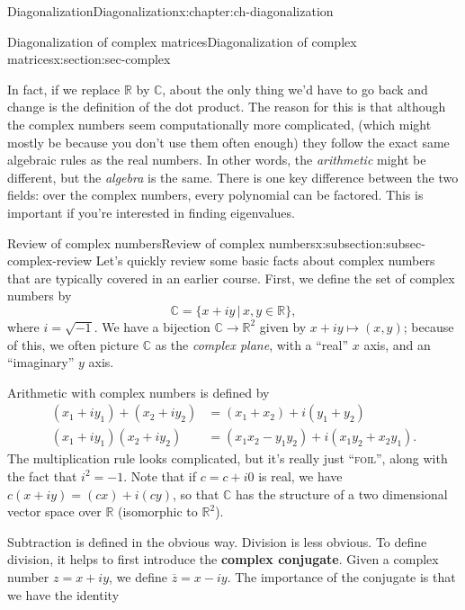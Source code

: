 \documentclass[oneside,10pt,]{book}
\newcommand{\initialism}[1]{\textsc{\MakeLowercase{#1}}}
\newcommand{\terminology}[1]{\textbf{#1}}
\numberwithin{equation}{section}
\newcommand{\R}{\mathbb{R}}
\renewcommand{\C}{\mathbb{C}}
\newcommand{\amp}{&}
\begin{document}
\begin{chapterptx}{Diagonalization}{}{Diagonalization}{}{}{x:chapter:ch-diagonalization}
\begin{sectionptx}{Diagonalization of complex matrices}{}{Diagonalization of complex matrices}{}{}{x:section:sec-complex}
\begin{introduction}{}
\par
In fact, if we replace \(\R\) by \(\C\), about the only thing we'd have to go back and change is the definition of the dot product. The reason for this is that although the complex numbers seem computationally more complicated, (which might mostly be because you don't use them often enough) they follow the exact same algebraic rules as the real numbers. In other words, the \emph{arithmetic} might be different, but the \emph{algebra} is the same. There is one key difference between the two fields: over the complex numbers, every polynomial can be factored. This is important if you're interested in finding eigenvalues.%
\end{introduction}%
%
%
\typeout{************************************************}
\typeout{************************************************}
%
\begin{subsectionptx}{Review of complex numbers}{}{Review of complex numbers}{}{}{x:subsection:subsec-complex-review}
Let's quickly review some basic facts about complex numbers that are typically covered in an earlier course. First, we define the set of complex numbers by%
\begin{equation*}
\C = \{x+iy \,|\, x,y\in \R\},
\end{equation*}
where \(i=\sqrt{-1}\). We have a bijection \(\C \to \R^2\) given by \(x+iy\mapsto (x,y)\); because of this, we often picture \(\C\) as the \emph{complex plane}, with a ``real'' \(x\) axis, and an ``imaginary'' \(y\) axis.%
\par
Arithmetic with complex numbers is defined by%
\begin{align*}
(x_1+iy_1)+(x_2+iy_2) \amp = (x_1+x_2)+i(y_1+y_2) \\
(x_1+iy_1)(x_2+iy_2) \amp = (x_1x_2-y_1y_2)+i(x_1y_2+x_2y_1)\text{.}
\end{align*}
The multiplication rule looks complicated, but it's really just ``\initialism{FOIL}'', along with the fact that \(i^2=-1\). Note that if \(c=c+i0\) is real, we have \(c(x+iy)=(cx)+i(cy)\), so that \(\C\) has the structure of a two dimensional vector space over \(\R\) (isomorphic to \(\R^2\)).%
\par
Subtraction is defined in the obvious way. Division is less obvious. To define division, it helps to first introduce the \terminology{complex conjugate}. Given a complex number \(z=x+iy\), we define \(\overline{z}=x-iy\). The importance of the conjugate is that we have the identity%
\begin{equation*}

\end{equation*}
\end{subsectionptx}
\end{sectionptx}
\end{chapterptx}
\end{document}
